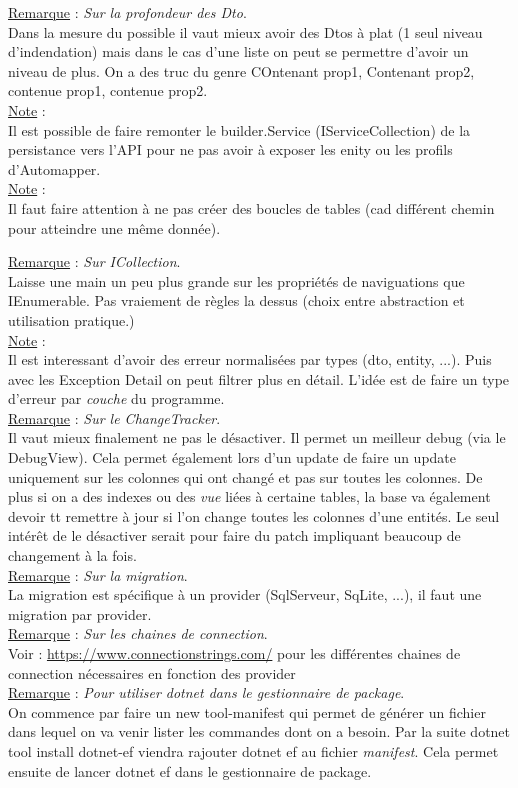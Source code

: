 \documentclass[a4paper,12pt,twoside]{article}
\newcommand{\incode}[1]{{\footnotesize\ttfamily #1}} %
\newcommand{\rem}[2]{\noindent\underline{Remarque} : \textit{#1}.\\ \indent #2}
\newcommand{\note}[1]{\noindent\underline{Note} : \\ \indent #1}
\begin{document}
\rem{Sur la profondeur des Dto}{Dans la mesure du possible il vaut mieux avoir des Dtos à plat (1 seul niveau d'indendation) mais dans le cas d'une liste on peut se permettre d'avoir un niveau de plus. On a des truc du genre COntenant prop1, Contenant prop2, contenue prop1, contenue prop2.}\\

\note{Il est possible de faire remonter le builder.Service (IServiceCollection) de la persistance vers l'API pour ne pas avoir à exposer les enity ou les profils d'Automapper.}\\

\note{Il faut faire attention à ne pas créer des boucles de tables (cad différent chemin pour atteindre une même donnée).}

\rem{Sur ICollection}{Laisse une main un peu plus grande sur les propriétés de naviguations que IEnumerable. Pas vraiement de règles la dessus (choix entre abstraction et utilisation pratique.)}\\

\note{Il est interessant d'avoir des erreur normalisées par types (dto, entity, ...). Puis avec les Exception Detail on peut filtrer plus en détail. L'idée est de faire un type d'erreur par \textit{couche} du programme.}\\

\rem{Sur le ChangeTracker}{Il vaut mieux finalement ne pas le désactiver. Il permet un meilleur debug (via le DebugView). Cela permet également lors d'un update de faire un update uniquement sur les colonnes qui ont changé et pas sur toutes les colonnes. De plus si on a des indexes ou des \textit{vue} liées à certaine tables, la base va également devoir tt remettre à jour si l'on change toutes les colonnes d'une entités. Le seul intérêt de le désactiver serait pour faire du patch impliquant beaucoup de changement à la fois.}\\

\rem{Sur la migration}{La migration est spécifique à un provider (SqlServeur, SqLite, ...), il faut une migration par provider.}\\

\rem{Sur les chaines de connection}{Voir : \url{https://www.connectionstrings.com/} pour les différentes chaines de connection nécessaires en fonction des provider}\\

\rem{Pour utiliser dotnet dans le gestionnaire de package}{On commence par faire un \incode{new tool-manifest} qui permet de générer un fichier dans lequel on va venir lister les commandes dont on a besoin. Par la suite \incode{dotnet tool install dotnet-ef} viendra rajouter dotnet ef au fichier \textit{manifest}. Cela permet ensuite de lancer \incode{dotnet ef} dans le gestionnaire de package.}\\
\end{document}
